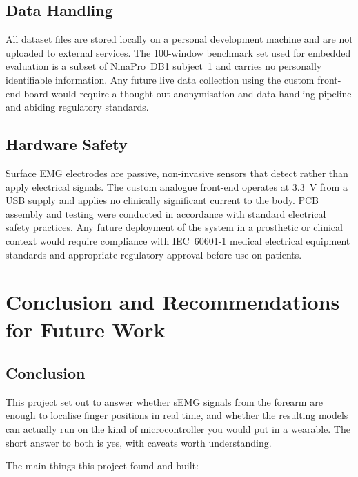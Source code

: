 \documentclass[11pt]{article}
\begin{document}
\subsection{Data Handling}

All dataset files are stored locally on a personal development machine and are not uploaded to external services. The 100-window benchmark set used for embedded evaluation is a subset of NinaPro~DB1 subject~1 and carries no personally identifiable information. Any future live data collection using the custom front-end board would require a thought out anonymisation and data handling pipeline and abiding regulatory standards.

\subsection{Hardware Safety}

Surface EMG electrodes are passive, non-invasive sensors that detect rather than apply electrical signals. The custom analogue front-end operates at 3.3~V from a USB supply and applies no clinically significant current to the body. PCB assembly and testing were conducted in accordance with standard electrical safety practices. Any future deployment of the system in a prosthetic or clinical context would require compliance with IEC~60601-1 medical electrical equipment standards and appropriate regulatory approval before use on patients.

\section{Conclusion and Recommendations for Future Work}
\label{sec:conclusion}

\subsection{Conclusion}

This project set out to answer whether sEMG signals from the forearm are enough to localise finger positions in real time, and whether the resulting models can actually run on the kind of microcontroller you would put in a wearable. The short answer to both is yes, with caveats worth understanding.

The main things this project found and built:
\end{document}
